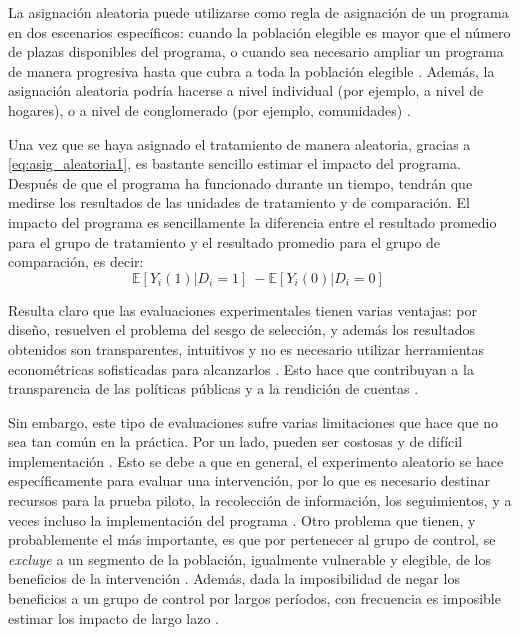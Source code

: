 \documentclass[../../main.tex]{subfiles}
\begin{document}
La asignación aleatoria puede utilizarse como regla de asignación de un programa en dos escenarios específicos: cuando la población elegible es mayor que el número de plazas disponibles del programa, o  cuando sea necesario ampliar un programa de manera progresiva hasta que cubra a toda la población elegible \cite{gertler-2016}. Además, la asignación aleatoria podría hacerse a nivel individual (por ejemplo, a nivel de hogares), o a nivel de conglomerado (por ejemplo, comunidades) \cite{bernal}.

Una vez que se haya asignado el tratamiento de manera aleatoria, gracias a \ref{eq:asig_aleatoria1}, es bastante sencillo estimar el impacto del programa. Después de que el programa ha funcionado durante un tiempo, tendrán que medirse los resultados de las unidades de tratamiento y de comparación. El impacto del programa es sencillamente la diferencia entre el resultado promedio para el grupo de tratamiento y el resultado promedio para el grupo de comparación, es decir:
\[
\mathbb{E} \left[Y_i(1)|D_i=1\right]\ - \mathbb{E} \left[Y_i(0)|D_i=0\right]\
\]

Resulta claro que las evaluaciones experimentales tienen varias ventajas: por diseño, resuelven el problema del sesgo de selección, y además los resultados obtenidos son transparentes, intuitivos y no es necesario utilizar herramientas econométricas sofisticadas para alcanzarlos \cite{bernal}. Esto hace que contribuyan a la transparencia de las políticas públicas y a la rendición de cuentas \cite{bernal}.

Sin embargo, este tipo de evaluaciones sufre varias limitaciones que hace que no sea tan común en la práctica. Por un lado, pueden ser costosas y de difícil implementación \cite{bernal}. Esto se debe a que en general, el experimento aleatorio se hace específicamente para evaluar una intervención, por lo que es necesario destinar recursos para la prueba piloto, la recolección de información, los seguimientos, y a veces incluso la implementación del programa \cite{bernal}. Otro problema que tienen, y probablemente el más importante, es que por pertenecer al grupo de control, se \textit{excluye} a un segmento de la población, igualmente vulnerable y elegible, de los beneficios de la intervención \cite{bernal}. Además, dada la imposibilidad de negar los beneficios a un grupo de control por largos períodos, con frecuencia es imposible estimar los impacto de largo lazo \cite{bernal}.   
\end{document}
